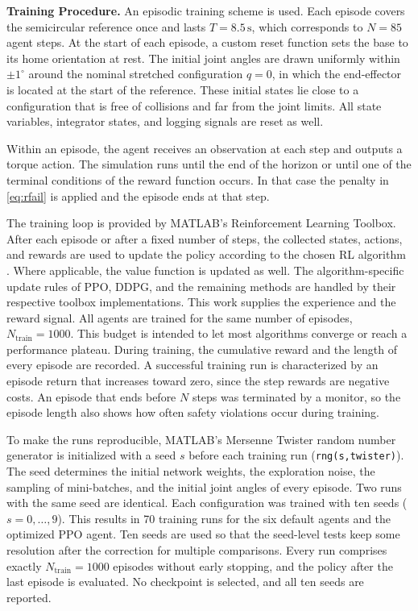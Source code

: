 \documentclass{ieeeaccess}
\begin{document}
\textbf{Training Procedure.} An episodic training scheme is used. Each episode covers the semicircular
reference once and lasts $T = 8.5\,\mathrm{s}$, which corresponds to $N = 85$ agent steps. At the start
of each episode, a custom reset function sets the base to its home orientation at rest. The initial
joint angles are drawn uniformly within $\pm 1^\circ$ around the nominal stretched configuration $q = 0$,
in which the end-effector is located at the start of the reference. These initial states lie close to
a configuration that is free of collisions and far from the joint limits. All state variables, integrator
states, and logging signals are reset as well.

Within an episode, the agent receives an observation at each step and outputs a torque action. The
simulation runs until the end of the horizon or until one of the terminal conditions of the reward
function occurs. In that case the penalty in \eqref{eq:rfail} is applied and the episode ends at that
step.

The training loop is provided by MATLAB's Reinforcement Learning Toolbox. After each episode or after a
fixed number of steps, the collected states, actions, and rewards are used to update the policy according
to the chosen RL algorithm \cite{b4}. Where applicable, the value function is updated as well. The
algorithm-specific update rules of PPO, DDPG, and the remaining methods are handled by their respective
toolbox implementations. This work supplies the experience and the reward signal. All agents
are trained for the same number of episodes, $N_{\mathrm{train}} = 1000$. This budget is intended to let
most algorithms converge or reach a performance plateau. During training, the cumulative reward and the
length of every episode are recorded. A successful training run is characterized by an episode return
that increases toward zero, since the step rewards are negative costs. An episode that ends before $N$
steps was terminated by a monitor, so the episode length also shows how often safety violations occur
during training.

To make the runs reproducible, MATLAB's Mersenne Twister random number generator is initialized with a
seed $s$ before each training run (\texttt{rng(s,\textquotesingle twister\textquotesingle)}). The seed
determines the initial network weights, the exploration noise, the sampling of mini-batches, and the
initial joint angles of every episode. Two runs with the same seed are identical. Each configuration was
trained with ten seeds ($s = 0,\dots,9$). This results in 70 training runs for the six default agents
and the optimized PPO agent. Ten seeds are used so that the seed-level tests keep some resolution
after the correction for multiple comparisons. Every run comprises exactly
$N_{\mathrm{train}} = 1000$ episodes without early stopping, and the policy after the last episode is
evaluated. No checkpoint is selected, and all ten seeds are reported.
\end{document}
